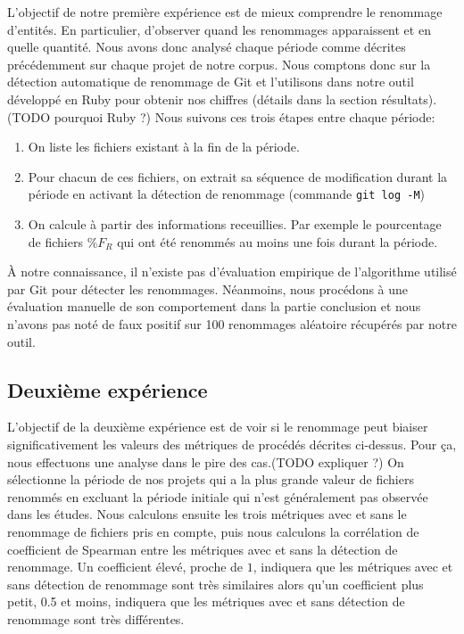  L'objectif de notre première expérience est de mieux comprendre le renommage d'entités. En particulier, d'observer quand les renommages apparaissent et en quelle quantité. Nous avons donc analysé chaque période comme décrites précédemment sur chaque projet de notre corpus. Nous comptons donc sur la détection automatique de renommage de Git et l'utilisons dans notre outil développé en Ruby pour obtenir nos chiffres (détails dans la section résultats). (TODO pourquoi Ruby ?) Nous suivons ces trois étapes entre chaque période:
\begin{enumerate}
\item On liste les fichiers existant à la fin de la période.
\item Pour chacun de ces fichiers, on extrait sa séquence de modification durant la période en activant la détection de renommage (commande \texttt{git log -M})
\item On calcule à partir des informations receuillies. Par exemple le pourcentage de fichiers $\%F_{R}$ qui ont été renommés au moins une fois durant la période.
\end{enumerate}
\medskip

À notre connaissance, il n'existe pas d'évaluation empirique de l'algorithme utilisé par Git pour détecter les renommages. Néanmoins, nous procédons à une évaluation manuelle de son comportement dans la partie conclusion et nous n'avons pas noté de faux positif sur 100 renommages aléatoire récupérés par notre outil.\\

\subsection{Deuxième expérience}

L'objectif de la deuxième expérience est de voir si le renommage peut biaiser significativement les valeurs des métriques de procédés décrites ci-dessus. Pour ça, nous effectuons une analyse dans le pire des cas.(TODO expliquer ?) On sélectionne la période de nos projets qui a la plus grande valeur de fichiers renommés en excluant la période initiale qui n'est généralement pas observée dans les études. Nous calculons ensuite les trois métriques avec et sans le renommage de fichiers pris en compte, puis nous calculons la corrélation de coefficient de Spearman entre les métriques avec et sans la détection de renommage. Un coefficient élevé, proche de $1$, indiquera que les métriques avec et sans détection de renommage sont très similaires alors qu'un coefficient plus petit, 0.5 et moins, indiquera que les métriques avec et sans détection de renommage sont très différentes.\\  

